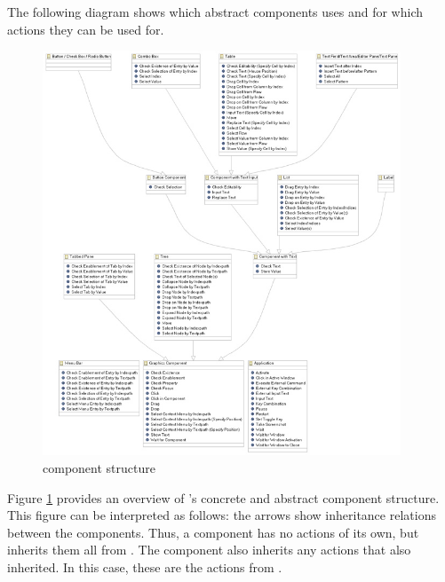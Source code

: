 \label{overviewabstcomp}
The following diagram shows which abstract components \app{} uses and for which actions they can be used for.  


\begin{figure}
\begin{center}
\includegraphics[width=0.95\textwidth]{Overview/PS/GUIdancerComponentHierarchysmall}
\caption{\app{} component structure}
\label{comp}
\end{center}
\end{figure}

Figure \ref{comp} provides an overview of \app{}'s concrete and abstract component structure. This figure can be interpreted as follows: the arrows show inheritance relations between the components. Thus, a  component has no actions of its own, but inherits them all from . The  component also inherits any actions that  also inherited. In this case, these are the actions from . 

\clearpage
